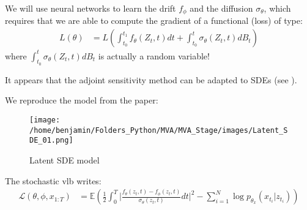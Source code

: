 We will use neural networks to learn the drift $f_{\phi}$ and the diffusion $\sigma_{\theta}$, which requires that we are able to compute the gradient of 
a functional (loss) of type:
\begin{align}
    L(\theta) &= L \left( \int_{t_0}^{t_1} f_{\theta}(Z_t, t)dt + \int_{t_0}^{t} \sigma_{\theta}(Z_t,t)dB_t \right)
\end{align}
where $\int_{t_0}^{t} \sigma_{\theta}(Z_t,t)dB_t$ is actually a random variable!

It appears that the adjoint sensitivity method can be adapted to SDEs (see \cite{li_scalable_2020}).

We reproduce the model from the paper:

\begin{figure}[H]
    \centering
    \texttt{[image: /home/benjamin/Folders\_Python/MVA/MVA\_Stage/images/Latent\_SDE\_01.png]}
    \caption{Latent SDE model}
    \label{fig:Latent SDE}
\end{figure}

The stochastic \gls{vlb} writes:
\begin{align}
    \mathcal{L}(\theta, \phi, x_{1:T}) &= \mathbb{E} \left(
        \frac{1}{2}\int_{0}^{T} \vert \frac{f_{\theta}(z_t,t) - f_{\phi}(z_t,t)}{\sigma_{\theta}(z_t,t)}dt \vert^{2} - 
        \sum_{i=1}^{N} \log{p_{\theta_x}}(x_{t_i} \vert z_{t_i})
        \right)
\end{align}
